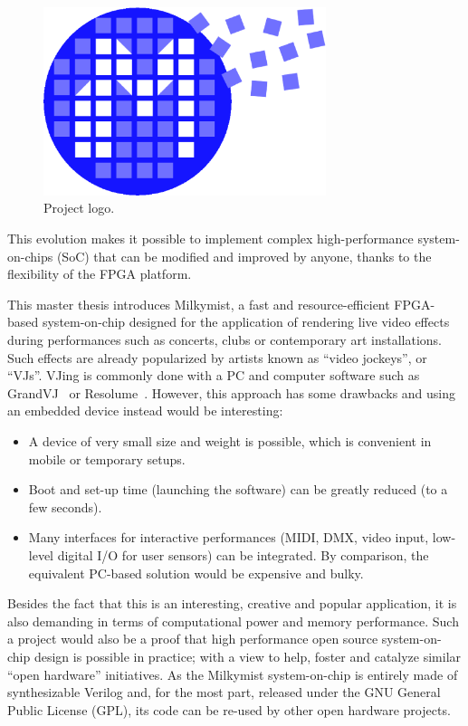 \documentclass[a4paper,11pt]{kthesis}
\begin{document}
\begin{figure}
\centering
\includegraphics[height=55mm]{newlogo.eps}
\caption{Project logo.} \label{fig:projectlogo}
\end{figure}

This evolution makes it possible to implement complex high-performance system-on-chips (SoC) that can be modified and improved by anyone, thanks to the flexibility of the FPGA platform.

This master thesis introduces Milkymist\texttrademark \cite{milkymist}, a fast and resource-efficient FPGA-based system-on-chip designed for the application of rendering live video effects during performances such as concerts, clubs or contemporary art installations. Such effects are already popularized by artists known as ``video jockeys'', or ``VJs''. VJing is commonly done with a PC and computer software such as GrandVJ~\cite{grandvj} or Resolume~\cite{resolume}. However, this approach has some drawbacks and using an embedded device instead would be interesting:
\begin{itemize}
\item A device of very small size and weight is possible, which is convenient in mobile or temporary setups.
\item Boot and set-up time (launching the software) can be greatly reduced (to a few seconds).
\item Many interfaces for interactive performances (MIDI, DMX, video input, low-level digital I/O for user sensors) can be integrated. By comparison, the equivalent PC-based solution would be expensive and bulky.
\end{itemize}

Besides the fact that this is an interesting, creative and popular application, it is also demanding in terms of computational power and memory performance. Such a project would also be a proof that high performance open source system-on-chip design is possible in practice; with a view to help, foster and catalyze similar ``open hardware'' initiatives. As the Milkymist system-on-chip is entirely made of synthesizable Verilog and, for the most part, released under the GNU General Public License (GPL), its code can be re-used by other open hardware projects.
\end{document}
